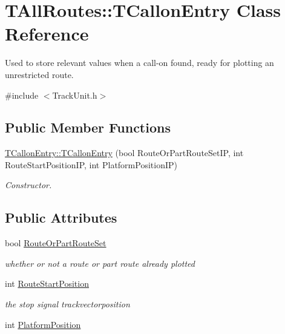 \hypertarget{class_t_all_routes_1_1_t_callon_entry}{}\section{T\+All\+Routes\+:\+:T\+Callon\+Entry Class Reference}
\label{class_t_all_routes_1_1_t_callon_entry}


Used to store relevant values when a call-\/on found, ready for plotting an unrestricted route.  




{\ttfamily \#include $<$Track\+Unit.\+h$>$}

\subsection*{Public Member Functions}
\begin{DoxyCompactItemize}
\item 
\mbox{\label{class_t_all_routes_1_1_t_callon_entry_a3e9f581932629ac09a2e9ccb86aec280}} 
\mbox{\hyperlink{class_t_all_routes_1_1_t_callon_entry_a3e9f581932629ac09a2e9ccb86aec280}{T\+Callon\+Entry\+::\+T\+Callon\+Entry}} (bool Route\+Or\+Part\+Route\+Set\+IP, int Route\+Start\+Position\+IP, int Platform\+Position\+IP)
\begin{DoxyCompactList}\small\item\em Constructor. \end{DoxyCompactList}\end{DoxyCompactItemize}
\subsection*{Public Attributes}
\begin{DoxyCompactItemize}
\item 
\mbox{\label{class_t_all_routes_1_1_t_callon_entry_aa6c0e221fef9538d988ddd6565af7fcb}} 
bool \mbox{\hyperlink{class_t_all_routes_1_1_t_callon_entry_aa6c0e221fef9538d988ddd6565af7fcb}{Route\+Or\+Part\+Route\+Set}}
\begin{DoxyCompactList}\small\item\em whether or not a route or part route already plotted \end{DoxyCompactList}\item 
\mbox{\label{class_t_all_routes_1_1_t_callon_entry_aeb47ca8fe4ce0ca46e07c35f2d353596}} 
int \mbox{\hyperlink{class_t_all_routes_1_1_t_callon_entry_aeb47ca8fe4ce0ca46e07c35f2d353596}{Route\+Start\+Position}}
\begin{DoxyCompactList}\small\item\em the stop signal trackvectorposition \end{DoxyCompactList}\item 
int \mbox{\hyperlink{class_t_all_routes_1_1_t_callon_entry_a538fe345a1cd31068c96302ef0055bd3}{Platform\+Position}}
\end{DoxyCompactItemize}


